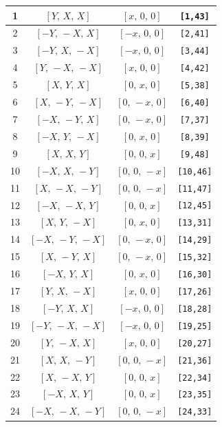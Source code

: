 \documentclass[fleqn,8pt]{jsarticle}
\begin{document}
\begin{longtable}{cccc}
1 & $\left[ Y,\, X,\, X \right]$ & $\left[ x,\, 0,\, 0 \right]$ & {\tt [1,43]} \\ \hline
2 & $\left[ - Y,\, - X,\, X \right]$ & $\left[ - x,\, 0,\, 0 \right]$ & {\tt [2,41]} \\ \hline
3 & $\left[ - Y,\, X,\, - X \right]$ & $\left[ - x,\, 0,\, 0 \right]$ & {\tt [3,44]} \\ \hline
4 & $\left[ Y,\, - X,\, - X \right]$ & $\left[ x,\, 0,\, 0 \right]$ & {\tt [4,42]} \\ \hline
5 & $\left[ X,\, Y,\, X \right]$ & $\left[ 0,\, x,\, 0 \right]$ & {\tt [5,38]} \\ \hline
6 & $\left[ X,\, - Y,\, - X \right]$ & $\left[ 0,\, - x,\, 0 \right]$ & {\tt [6,40]} \\ \hline
7 & $\left[ - X,\, - Y,\, X \right]$ & $\left[ 0,\, - x,\, 0 \right]$ & {\tt [7,37]} \\ \hline
8 & $\left[ - X,\, Y,\, - X \right]$ & $\left[ 0,\, x,\, 0 \right]$ & {\tt [8,39]} \\ \hline
9 & $\left[ X,\, X,\, Y \right]$ & $\left[ 0,\, 0,\, x \right]$ & {\tt [9,48]} \\ \hline
10 & $\left[ - X,\, X,\, - Y \right]$ & $\left[ 0,\, 0,\, - x \right]$ & {\tt [10,46]} \\ \hline
11 & $\left[ X,\, - X,\, - Y \right]$ & $\left[ 0,\, 0,\, - x \right]$ & {\tt [11,47]} \\ \hline
12 & $\left[ - X,\, - X,\, Y \right]$ & $\left[ 0,\, 0,\, x \right]$ & {\tt [12,45]} \\ \hline
13 & $\left[ X,\, Y,\, - X \right]$ & $\left[ 0,\, x,\, 0 \right]$ & {\tt [13,31]} \\ \hline
14 & $\left[ - X,\, - Y,\, - X \right]$ & $\left[ 0,\, - x,\, 0 \right]$ & {\tt [14,29]} \\ \hline
15 & $\left[ X,\, - Y,\, X \right]$ & $\left[ 0,\, - x,\, 0 \right]$ & {\tt [15,32]} \\ \hline
16 & $\left[ - X,\, Y,\, X \right]$ & $\left[ 0,\, x,\, 0 \right]$ & {\tt [16,30]} \\ \hline
17 & $\left[ Y,\, X,\, - X \right]$ & $\left[ x,\, 0,\, 0 \right]$ & {\tt [17,26]} \\ \hline
18 & $\left[ - Y,\, X,\, X \right]$ & $\left[ - x,\, 0,\, 0 \right]$ & {\tt [18,28]} \\ \hline
19 & $\left[ - Y,\, - X,\, - X \right]$ & $\left[ - x,\, 0,\, 0 \right]$ & {\tt [19,25]} \\ \hline
20 & $\left[ Y,\, - X,\, X \right]$ & $\left[ x,\, 0,\, 0 \right]$ & {\tt [20,27]} \\ \hline
21 & $\left[ X,\, X,\, - Y \right]$ & $\left[ 0,\, 0,\, - x \right]$ & {\tt [21,36]} \\ \hline
22 & $\left[ X,\, - X,\, Y \right]$ & $\left[ 0,\, 0,\, x \right]$ & {\tt [22,34]} \\ \hline
23 & $\left[ - X,\, X,\, Y \right]$ & $\left[ 0,\, 0,\, x \right]$ & {\tt [23,35]} \\ \hline
24 & $\left[ - X,\, - X,\, - Y \right]$ & $\left[ 0,\, 0,\, - x \right]$ & {\tt [24,33]} \\
\end{longtable}
\end{document}
